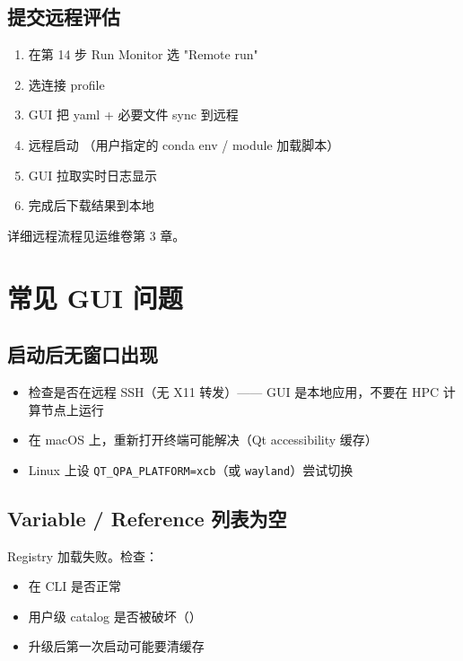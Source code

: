 \subsection{提交远程评估}

\begin{enumerate}
  \item 在第 14 步 Run Monitor 选 "Remote run"
  \item 选连接 profile
  \item GUI 把 yaml + 必要文件 sync 到远程
  \item 远程启动 （用户指定的 conda env / module 加载脚本）
  \item GUI 拉取实时日志显示
  \item 完成后下载结果到本地 
\end{enumerate}

详细远程流程见运维卷第 3 章。

\section{常见 GUI 问题}

\subsection{启动后无窗口出现}

\begin{itemize}
  \item 检查是否在远程 SSH（无 X11 转发）—— GUI 是本地应用，不要在 HPC 计算节点上运行
  \item 在 macOS 上，重新打开终端可能解决（Qt accessibility 缓存）
  \item Linux 上设 \texttt{QT\_QPA\_PLATFORM=xcb}（或 \texttt{wayland}）尝试切换
\end{itemize}

\subsection{Variable / Reference 列表为空}

Registry 加载失败。检查：

\begin{itemize}
  \item {} 在 CLI 是否正常
  \item 用户级 catalog 是否被破坏（）
  \item 升级后第一次启动可能要清缓存
\end{itemize}

